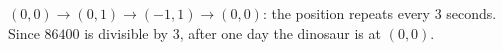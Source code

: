 $(0,0)\to(0,1)\to(-1,1)\to(0,0)$: the position repeats every $3$ seconds. Since $86400$ is divisible by $3$, after one day the dinosaur is at $\boxed{(0,0)}$.
